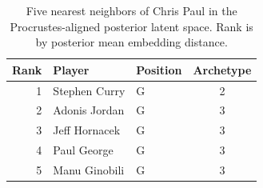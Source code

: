 \begin{table}[htbp]
  \centering\small
  \begin{tabular}{rllc}
    \toprule
    Rank & Player & Position & Archetype \\
    \midrule
    1 & Stephen Curry & G & 2 \\
    2 & Adonis Jordan & G & 3 \\
    3 & Jeff Hornacek & G & 3 \\
    4 & Paul George & G & 3 \\
    5 & Manu Ginobili & G & 3 \\
    \bottomrule
  \end{tabular}
  \caption{Five nearest neighbors of Chris Paul in the Procrustes-aligned posterior latent space. Rank is by posterior mean embedding distance.}
  \label{tab:Chris_Paul_neighbors}
\end{table}

